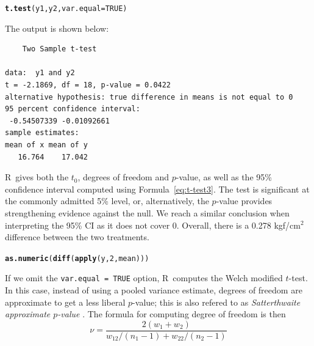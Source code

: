 \documentclass[11pt,a4paper]{memoir}\usepackage[]{graphicx}\usepackage[]{color}
\makeatletter
\newcommand{\hlnum}[1]{\textcolor[rgb]{0.686,0.059,0.569}{#1}}%
\newcommand{\hlstd}[1]{\textcolor[rgb]{0.345,0.345,0.345}{#1}}%
\newcommand{\hlkwc}[1]{\textcolor[rgb]{0.333,0.667,0.333}{#1}}%
\newcommand{\hlkwd}[1]{\textcolor[rgb]{0.737,0.353,0.396}{\textbf{#1}}}%
\newenvironment{kframe}{%
 \def\at@end@of@kframe{}%
 \ifinner\ifhmode%
  \def\at@end@of@kframe{\end{minipage}}%
  \begin{minipage}{\columnwidth}%
 \fi\fi%
 \def\FrameCommand##1{\hskip\@totalleftmargin \hskip-\fboxsep
 \colorbox{shadecolor}{##1}\hskip-\fboxsep
     \hskip-\linewidth \hskip-\@totalleftmargin \hskip\columnwidth}%
 \MakeFramed {\advance\hsize-\width
   \@totalleftmargin\z@ \linewidth\hsize
   \@setminipage}}%
 {\par\unskip\endMakeFramed%
 \at@end@of@kframe}
\newenvironment{knitrout}{}{} %
\newcommand{\R}{\textsf{R}}
\makeatother
\begin{document}
\begin{knitrout}
\color{fgcolor}\begin{kframe}
\begin{alltt}
\hlkwd{t.test}\hlstd{(y1, y2,} \hlkwc{var.equal} \hlstd{=} \hlnum{TRUE}\hlstd{)}
\end{alltt}
\end{kframe}
\end{knitrout}


The output is shown below:
\begin{verbatim}
	Two Sample t-test

data:  y1 and y2 
t = -2.1869, df = 18, p-value = 0.0422
alternative hypothesis: true difference in means is not equal to 0 
95 percent confidence interval:
 -0.54507339 -0.01092661 
sample estimates:
mean of x mean of y 
   16.764    17.042 
\end{verbatim}
\R\ gives both the $t_0$, degrees of freedom and $p$-value, as well as
the 95\% confidence interval computed using
Formula~\ref{eq:t-test3}. The test is significant at the commonly
admitted 5\% level, or, alternatively, the $p$-value provides
strengthening evidence against the null. We reach a similar conclusion
when interpreting the 95\% CI as it does not cover 0. Overall, there
is a 0.278 kgf/cm$^2$ difference between the two treatments.

\begin{knitrout}
\color{fgcolor}\begin{kframe}
\begin{alltt}
\hlkwd{as.numeric}\hlstd{(}\hlkwd{diff}\hlstd{(}\hlkwd{apply}\hlstd{(y,}\hlnum{2}\hlstd{,mean)))}
\end{alltt}
\end{kframe}
\end{knitrout}

\label{para:Welch}
If we omit the \texttt{var.equal = TRUE} option, \R\ computes the Welch
modified $t$-test. In this case, instead of using a pooled variance
estimate, degrees of freedom are approximate to get a less liberal
$p$-value; this is also refered to as \emph{Satterthwaite approximate
$p$-value} \autocite{Satterthwaite:1946,Welch:1947}. The formula for
computing degree of freedom is then
\begin{equation}\label{eq:satterthwaite}
  \nu=\frac{2(w_1+w_2)}{w_{12}/(n_1-1)+w_{22}/(n_2-1)}
\end{equation}
\end{document}
